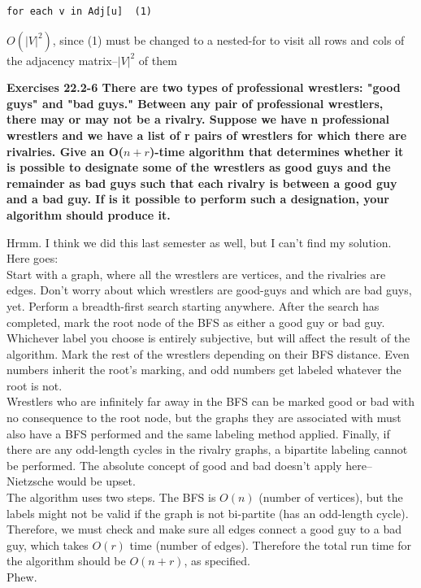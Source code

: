 \documentclass[10pt,fullpage]{article}
\begin{document}
\begin{verbatim}for each v in Adj[u]  (1)\end{verbatim}

$O(|V|^2)$, since (1) must be changed to a nested-for to visit all
rows and cols of the adjacency matrix--$|V|^2$ of them

\newpage

\textbf{Exercises 22.2-6  There are two types of professional
wrestlers: "good guys" and "bad guys." Between any pair of
professional wrestlers, there may or may not be a rivalry. Suppose
we have n professional wrestlers and we have a list of r pairs of
wrestlers for which there are rivalries. Give an O($n + r$)-time
algorithm that determines whether it is possible to designate some
of the wrestlers as good guys and the remainder as bad guys such
that each rivalry is between a good guy and a bad guy. If is it
possible to perform such a designation, your algorithm should
produce it. }

Hrmm. I think we did this last semester as well, but I can't find my
solution. Here goes:\\

Start with a graph, where all the wrestlers are vertices, and the
rivalries are edges. Don't worry about which wrestlers are good-guys
and which are bad guys, yet. Perform a breadth-first search starting
anywhere. After the search has completed, mark the root node of the
BFS as either a good guy or bad guy. Whichever label you choose is
entirely subjective, but will affect the result of the algorithm.
Mark the rest of the wrestlers depending on their BFS distance. Even
numbers inherit the root's marking, and odd numbers get labeled
whatever the root is not.\\

Wrestlers who are infinitely far away in the BFS can be marked good
or bad with no consequence to the root node, but the graphs they are
associated with must also have a BFS performed and the same labeling
method applied. Finally, if there are any odd-length cycles in the
rivalry graphs, a bipartite labeling cannot be performed. The
absolute concept of good and bad doesn't apply here--Nietzsche would
be upset.\\

The algorithm uses two steps. The BFS is $O(n)$ (number of
vertices), but the labels might not be valid if the graph is not
bi-partite (has an odd-length cycle). Therefore, we must check and
make sure all edges connect a good guy to a bad guy, which takes
$O(r)$ time (number of edges). Therefore the total run time for the
algorithm should be $O(n + r)$, as specified.\\

Phew.\\

\newpage
\end{document}
